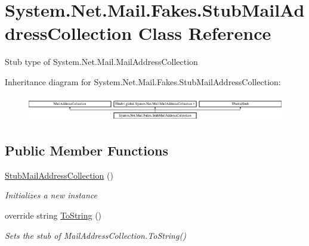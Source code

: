 \hypertarget{class_system_1_1_net_1_1_mail_1_1_fakes_1_1_stub_mail_address_collection}{\section{System.\-Net.\-Mail.\-Fakes.\-Stub\-Mail\-Address\-Collection Class Reference}
\label{class_system_1_1_net_1_1_mail_1_1_fakes_1_1_stub_mail_address_collection}
}


Stub type of System.\-Net.\-Mail.\-Mail\-Address\-Collection 


Inheritance diagram for System.\-Net.\-Mail.\-Fakes.\-Stub\-Mail\-Address\-Collection\-:\begin{figure}[H]
\begin{center}
\leavevmode
\includegraphics[height=1.124498cm]{class_system_1_1_net_1_1_mail_1_1_fakes_1_1_stub_mail_address_collection}
\end{center}
\end{figure}
\subsection*{Public Member Functions}
\begin{DoxyCompactItemize}
\item 
\hyperlink{class_system_1_1_net_1_1_mail_1_1_fakes_1_1_stub_mail_address_collection_aa14b2694324c52248725e6d07c1d48e0}{Stub\-Mail\-Address\-Collection} ()
\begin{DoxyCompactList}\small\item\em Initializes a new instance\end{DoxyCompactList}\item 
override string \hyperlink{class_system_1_1_net_1_1_mail_1_1_fakes_1_1_stub_mail_address_collection_a9fdb3dda4330b31428781a6d13aedc68}{To\-String} ()
\begin{DoxyCompactList}\small\item\em Sets the stub of Mail\-Address\-Collection.\-To\-String()\end{DoxyCompactList}\end{DoxyCompactItemize}
